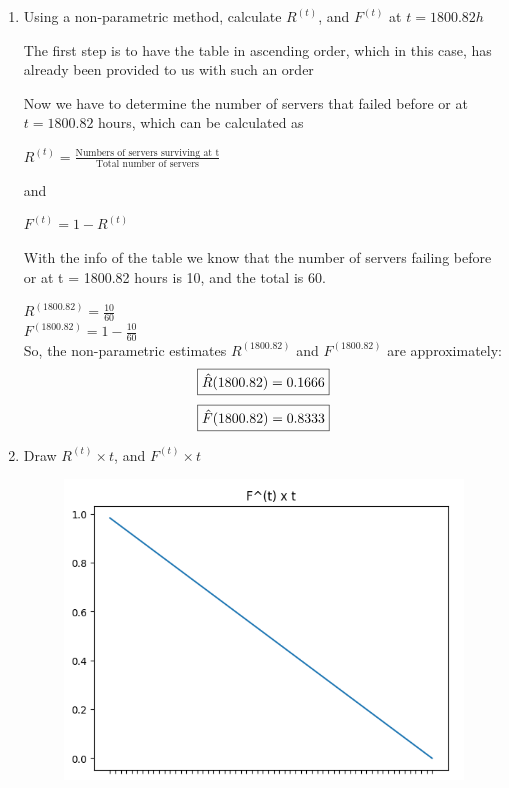 \documentclass{article}
\begin{document}
\begin{enumerate}[label=(\alph*)]
    \item Using a non-parametric method, calculate $R^(t)$, and $F^(t)$ at $t = 1800.82h$       \begin{flushleft}
            The first step is to have the table in ascending order, which in this case, has already been provided to us with such an order

            Now we have to determine the number of servers that failed before or at $t = 1800.82$ hours, which can be calculated as

            \(R^(t) = \frac{\text{Numbers of servers surviving at t}}{\text{Total number of servers}}\)

            and 
            
            \(F^(t) = 1 - R^(t)\)

            With the info of the table we know that the number of servers failing before or at t = 1800.82 hours is 10, and the total is 60.

            \(R^(1800.82) = \frac{10}{60}\)  \\

            \(F^(1800.82) = 1 - \frac{10}{60}\) \\

        
            So, the non-parametric estimates $R^(1800.82)$ and $F^(1800.82)$ are approximately:
            \[\fbox{$\hat{R}(1800.82) = 0.1666$}\]
            \[\fbox{$\hat{F}(1800.82) = 0.8333$}\]

        \end{flushleft}

    \item Draw $R^(t) \times t$, and $F^(t) \times t$
        \begin{flushleft}
            \begin{figure}[H]
                \centering
                \includegraphics[width=0.7\linewidth]{ft_q3.png}
                \label{fig:F^(t) x t}
            \end{figure}
        \end{flushleft}


\end{enumerate}
\end{document}
